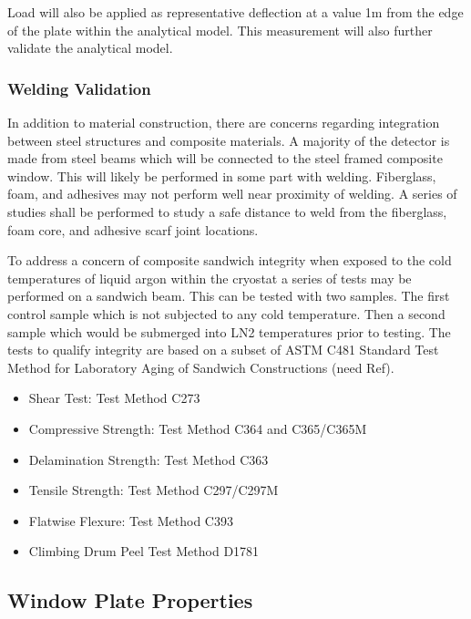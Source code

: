 Load will also be applied as representative deflection at a value 1m from the edge of the plate within
the analytical model. This measurement will also further validate the analytical model.

\subsubsection{Welding Validation}
\label{sec:cryost-proto-sandbeam-weldval}

In addition to material construction, there are concerns regarding integration between steel
structures and composite materials. A majority of the detector is made from steel beams which will
be connected to the steel framed composite window. This will likely be performed in some part with
welding. Fiberglass, foam, and adhesives may not perform well near proximity of welding. A series
of studies shall be performed to study a safe distance to weld from the fiberglass, foam core, and
adhesive scarf joint locations.

To address a concern of composite sandwich integrity when exposed to the cold temperatures of
liquid argon within the cryostat a series of tests may be performed on a sandwich beam. This can be
tested with two samples. The first control sample which is not subjected to any cold temperature.
Then a second sample which would be submerged into LN2 temperatures prior to testing.
The tests to qualify integrity are based on a subset of ASTM C481 Standard Test Method for
Laboratory Aging of Sandwich Constructions (need Ref).

\begin{itemize}
    \item Shear Test: Test Method C273
    \item Compressive Strength: Test Method C364 and C365/C365M
    \item Delamination Strength: Test Method C363
    \item Tensile Strength: Test Method C297/C297M
    \item Flatwise Flexure: Test Method C393
    \item Climbing Drum Peel Test Method D1781
\end{itemize}

\subsection{Window Plate Properties}
\label{sec:cryost-proto-winplate-prop}


